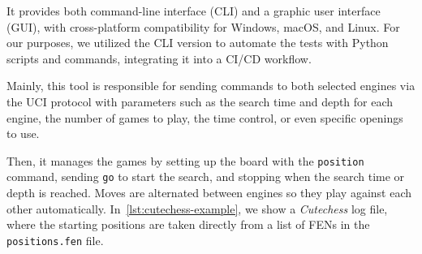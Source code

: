 \vspace{1em}

\noindent It provides both command-line interface (CLI) and a graphic user interface (GUI), with cross-platform compatibility for Windows, macOS, and Linux. For our purposes, we utilized the CLI version to automate the tests with Python scripts and commands, integrating it into a CI/CD workflow.

\vspace{1em}

\noindent Mainly, this tool is responsible for sending commands to both selected engines via the UCI protocol with parameters such as the search time and depth for each engine, the number of games to play, the time control, or even specific openings to use.

\vspace{1em}

\noindent Then, it manages the games by setting up the board with the \texttt{position} command, sending \texttt{go} to start the search, and stopping when the search time or depth is reached. Moves are alternated between engines so they play against each other automatically. In~\cref{lst:cutechess-example}, we show a \textit{Cutechess} log file, where the starting positions are taken directly from a list of FENs in the \texttt{positions.fen} file.

